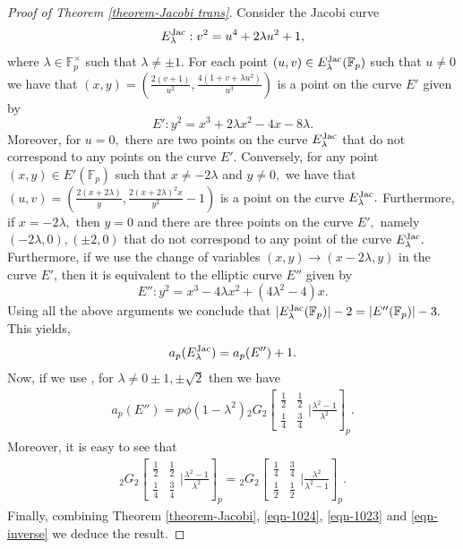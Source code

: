 \documentclass[12pt]{amsart}
\theoremstyle{plain}
\theoremstyle{definition}
\theoremstyle{remark}
\newcommand{\F}{\mathbb{F}}
\newcommand{\jac}{\text{{\rm{Jac}}}}
\numberwithin{equation}{section}
\begin{document}
\begin{proof}[Proof of Theorem \ref{theorem-Jacobi trans}]
Consider the Jacobi curve $$E^{\jac}_{\lambda}: v^2=u^4+2\lambda u^2+1,$$ where $\lambda\in\F_p^{\times}$ such that $\lambda\neq\pm1.$  For each point $(u,v)\in E^{\jac}_{\lambda}(\F_p)$ such that $u\neq0$ we have that $(x,y)= \left(\frac{2(v+1)}{u^2},\frac{4(1+v+\lambda u^2)}{u^3}\right)$ is a point on the curve $E'$ given by $$E': y^2=x^3+2\lambda x^2-4x-8\lambda.$$ Moreover, for $u=0,$ there are two points on the curve $E^{\jac}_{\lambda}$ that do not correspond to any points on the curve $E'.$
Conversely, for any point $(x,y)\in E'(\F_p)$ such that $x\neq-2\lambda$ and $y\neq0,$ we have that $(u,v)=\left(\frac{2(x+2\lambda)}{y}, \frac{2(x+2\lambda)^2x}{y^2}-1\right)$ is a point on the curve $E^{\jac}_{\lambda}.$
Furthermore, if $x=-2\lambda,$ then $y=0$ and there are three points on the curve $E',$ namely $(-2\lambda,0),(\pm2,0)$ that do not correspond to any point of the curve $E^{\jac}_{\lambda}.$
Furthermore, if we use the change of variables $(x,y)\rightarrow({x-2\lambda},y)$ in the curve $E'$, then it is equivalent to the elliptic curve $E''$ given by 
$$E'':y^2=x^3-4\lambda x^2+(4\lambda ^2-4)x.$$
Using all the above arguments we conclude that $|E^{\jac}_{\lambda}(\F_p)|-2=|E''(\F_p)|-3.$ This yields,
\begin{align}\label{eqn-1024}
 a_p(E^{\jac}_\lambda)=a_p(E'')+1.
 \end{align}
 Now, if we use \cite[Theorem 3.5]{BS}, for $\lambda\neq0\pm1,\pm\sqrt{2}$ then we have 
\begin{align}\label{eqn-1023}
a_p(E'')=p\phi(1-\lambda^2){_2G_2}\left[\begin{array}{cc}
  \frac{1}{2}   & \frac{1}{2}  \\
  \frac{1}{4}    & \frac{3}{4}  \end{array}|\frac{\lambda^2-1}{\lambda^2}\right]_p.
\end{align}
Moreover, it is easy to see that 
\begin{align}\label{eqn-inverse}
{_2G_2}\left[\begin{array}{cc}
  \frac{1}{2}   & \frac{1}{2}  \\
  \frac{1}{4}    & \frac{3}{4}  \end{array}|\frac{\lambda^2-1}{\lambda^2}\right]_p={_2G_2}\left[\begin{array}{cc}
\frac{1}{4}   & \frac{3}{4} \\
  \frac{1}{2}    & \frac{1}{2}  \end{array}|\frac{\lambda^2}{\lambda^2-1}\right]_p.
  \end{align}
Finally, combining Theorem \ref{theorem-Jacobi}, \eqref{eqn-1024}, \eqref{eqn-1023} and \eqref{eqn-inverse} we deduce the result.
\end{proof}
\end{document}
